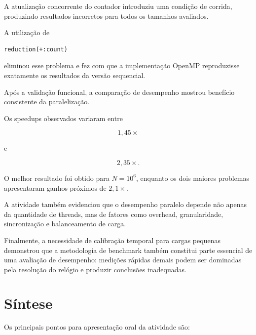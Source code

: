A atualização concorrente do contador introduziu uma condição de corrida,
produzindo resultados incorretos para todos os tamanhos avaliados.

A utilização de

\begin{verbatim}
reduction(+:count)
\end{verbatim}

eliminou esse problema e fez com que a implementação OpenMP reproduzisse
exatamente os resultados da versão sequencial.

Após a validação funcional, a comparação de desempenho mostrou benefício
consistente da paralelização.

Os speedups observados variaram entre

\[
1,45\times
\]

e

\[
2,35\times.
\]

O melhor resultado foi obtido para \(N=10^6\), enquanto os dois maiores
problemas apresentaram ganhos próximos de \(2,1\times\).

A atividade também evidenciou que o desempenho paralelo depende não apenas
da quantidade de threads, mas de fatores como overhead, granularidade,
sincronização e balanceamento de carga.

Finalmente, a necessidade de calibração temporal para cargas pequenas
demonstrou que a metodologia de benchmark também constitui parte essencial
de uma avaliação de desempenho: medições rápidas demais podem ser dominadas
pela resolução do relógio e produzir conclusões inadequadas.


\section{Síntese}
\label{sec:atvd05-defesa}

Os principais pontos para apresentação oral da atividade são:

